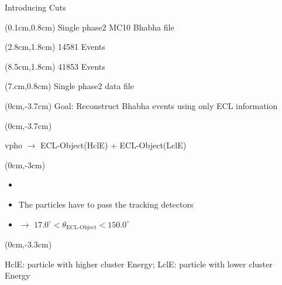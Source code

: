 \documentclass[8pt]{beamer}
\begin{document}
\begin{frame}{Introducing Cuts}
\begin{textblock*}{11cm}
\begin{figure}[h!]
\end{figure}

\end{textblock*}
\pause[4]

\begin{textblock*}{5cm}(0.1cm,0.8cm)
	\centering
	Single phase2 MC10 Bhabha file
\end{textblock*}


\begin{textblock*}{4cm}(2.8cm,1.8cm)
	14581 Events
\end{textblock*}
\pause[5]

\begin{textblock*}{4cm}(8.5cm,1.8cm)
	41853 Events
\end{textblock*}


\begin{textblock*}{4cm}(7.cm,0.8cm)
	Single phase2 data file
\end{textblock*}


\pause[6]



\pause[1]




		


	
\begin{textblock*}{11cm}(0cm,-3.7cm)
				Goal: Reconstruct Bhabha events using only ECL information

	\end{textblock*}
\begin{textblock*}{11cm}(0cm,-3.7cm)	
	\begin{center}
		
		vpho $\rightarrow$ ECL-Object(HclE) + ECL-Object(LclE)		
	\end{center}
\end{textblock*}
\pause[2]
	\begin{textblock*}{11cm}(0cm,-3cm)
	
	\begin{itemize}
		\item[]
		\item The particles have to pass the tracking detectors
		\item[] $\rightarrow$ $17.0^{\circ} < \theta_{\textrm{ECL-Object}} < 150.0^{\circ}$

	\end{itemize}	
\end{textblock*}


\pause[1]
\begin{textblock*}{11cm}(0cm,-3.3cm)
	\begin{center}
		\footnotesize{HclE: particle with higher cluster Energy; LclE: particle with lower cluster Energy}
	\end{center}
\end{textblock*}


\end{frame}
\end{document}
